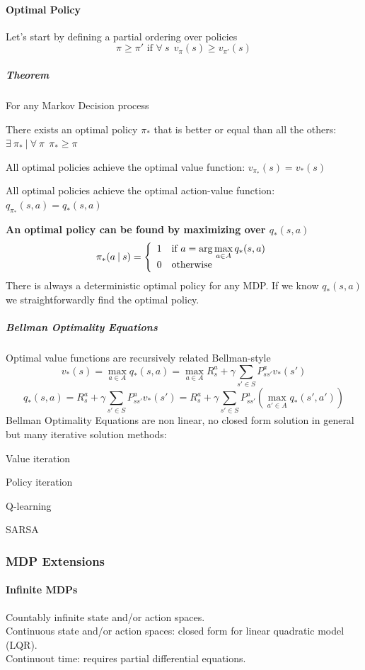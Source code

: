 \documentclass[10pt]{report}
\begin{document}
\paragraph{Optimal Policy} Let's start by defining a partial ordering over policies $$\pi\geq \pi'\text{ if }\forall\:s\:\:v_\pi(s)\geq v_{\pi'}(s)$$
\subparagraph{Theorem} For any Markov Decision process\begin{list}{}{}
	\item There exists an optimal policy $\pi_*$ that is better or equal than all the others: $\exists\:\pi_*\:|\:\forall\:\pi\:\:\pi_*\geq \pi$
	\item All optimal policies achieve the optimal value function: $v_{\pi_*}(s) = v_*(s)$
	\item All optimal policies achieve the optimal action-value function: $q_{\pi_*}(s,a) = q_*(s,a)$
\end{list}
\textbf{An optimal policy can be found by maximizing over $q_*(s,a)$}
$$\pi_*(a\:|\:s)=\left\{\begin{array}{l l}
1&\text{if }a=\arg\displaystyle \max_{a\in A} q_*(s,a)\\
0&\text{otherwise}
\end{array}\right.$$
There is always a deterministic optimal policy for any MDP. If we know $q_*(s,a)$ we straightforwardly find the optimal policy.
\subparagraph{Bellman Optimality Equations} Optimal value functions are recursively related Bellman-style
$$v_*(s)= \max_{a\in A}q_*(s,a) = \max_{a\in A}R_s^a + \gamma\sum_{s'\in S}P_{ss'}^av_*(s')$$
$$q_*(s,a)=R_s^a + \gamma\sum_{s'\in S} P_{ss'}^av_*(s') = R_s^a + \gamma\sum_{s'\in S}P_{ss'}^a\left(\max_{a'\in A}q_*(s',a')\right)$$
Bellman Optimality Equations are non linear, no closed form solution in general but many iterative solution methods:
\begin{list}{}{}
	\item Value iteration
	\item Policy iteration
	\item Q-learning
	\item SARSA
\end{list}
\subsubsection{MDP Extensions}
\paragraph{Infinite MDPs} Countably infinite state and/or action spaces.\\
Continuous state and/or action spaces: closed form for linear quadratic model (LQR).\\
Continuout time: requires partial differential equations.
\end{document}
